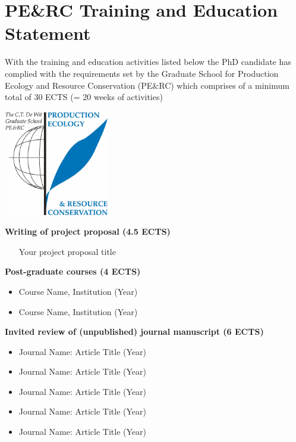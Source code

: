 \chapter{PE\&RC Training and Education Statement}

\begin{minipage}[c]{.55\textwidth}

With the training and education activities listed below the PhD candidate has complied with the requirements set by the Graduate School for Production Ecology and Resource Conservation (PE\&RC) which comprises of a minimum total of 30 ECTS (= 20 weeks of activities) 
\end{minipage}
\begin{minipage}[c]{.35\textwidth}
\begin{flushright}
\vspace{0pt}\includegraphics[width=4.6cm,height=4.6cm]{PERC_logo.pdf}
\end{flushright}
\end{minipage}

\bigskip

\textbf{Writing of project proposal (4.5 ECTS)}
\begin{itemize}[nolistsep]
    \item [Your project proposal title]
\end{itemize}

\textbf{Post-graduate courses (4 ECTS)}
\begin{itemize}[nolistsep]
    \item Course Name, Institution (Year)
    \item Course Name, Institution (Year)
\end{itemize}

\textbf{Invited review of (unpublished) journal manuscript (6 ECTS)}
\begin{itemize}[nolistsep]
    \item Journal Name: Article Title (Year)
    \item Journal Name: Article Title (Year)
    \item Journal Name: Article Title (Year)
    \item Journal Name: Article Title (Year)
    \item Journal Name: Article Title (Year)
\end{itemize}

